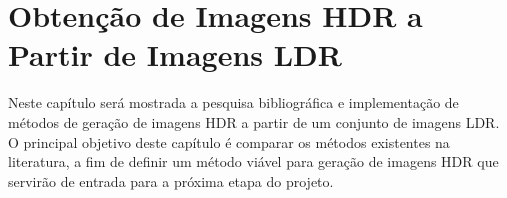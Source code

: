 \chapter{Obtenção de Imagens HDR a Partir de Imagens LDR} \label{parteHDR}
Neste capítulo será mostrada a pesquisa bibliográfica e implementação de métodos de geração de imagens HDR a partir de um conjunto de imagens LDR. O principal objetivo deste capítulo é comparar os métodos existentes na literatura, a fim de definir um método viável para geração de imagens HDR que servirão de entrada para a próxima etapa do projeto.
